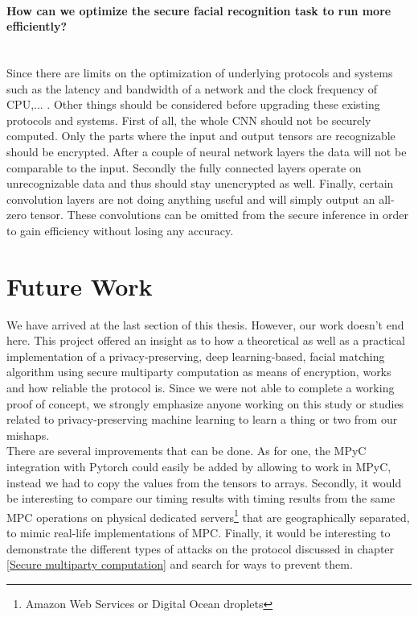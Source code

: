 \paragraph{How can we optimize the secure facial recognition task to run more efficiently?}\mbox{}
\\
Since there are limits on the optimization of underlying protocols and systems such as the latency and bandwidth of a network and the clock frequency of CPU,... . Other things should be considered before upgrading these existing protocols and systems. First of all, the whole CNN should not be securely computed. Only the parts where the input and output tensors are recognizable should be encrypted. After a couple of neural network layers the data will not be comparable to the input. Secondly the fully connected layers operate on unrecognizable data and thus should stay unencrypted as well. Finally, certain convolution layers are not doing anything useful and will simply output an all-zero tensor. These convolutions can be omitted from the secure inference in order to gain efficiency without losing any accuracy.


\section{Future Work}
We have arrived at the last section of this thesis. However, our work doesn't end here. This project offered an insight as to how a theoretical as well as a practical implementation of a privacy-preserving, deep learning-based, facial matching algorithm using secure multiparty computation as means of encryption, works and how reliable the protocol is. Since we were not able to complete a working proof of concept, we strongly emphasize anyone working on this study or studies related to privacy-preserving machine learning to learn a thing or two from our mishaps.\\

There are several improvements that can be done. As for one, the MPyC integration with Pytorch could easily be added by allowing  to work in MPyC, instead we had to copy the values from the tensors to arrays. Secondly, it would be interesting to compare our timing results with timing results from the same MPC operations on physical dedicated servers\footnote{Amazon Web Services or Digital Ocean droplets} that are geographically separated, to mimic real-life implementations of MPC. Finally, it would be interesting to demonstrate the different types of attacks on the protocol discussed in chapter \ref{Secure multiparty computation} and search for ways to prevent them.
